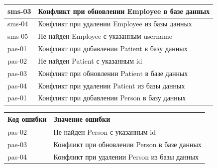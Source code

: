 \documentclass[a4paper,article]{article}
\begin{document}
\begin{sloppypar}
\begin{appendices}
\begin{xltabular}{\textwidth} { |
                >{\hsize} X |
                >{\hsize} X | }
            \hline
            sms-03
            & Конфликт при обновлении Employee в базе данных \\
            
            \hline
            sms-04
            & Конфликт при удалении Employee из базы данных \\
            
            \hline
            sms-05
            & Не найден Employee с указанным username \\
            
            \hline
            pas-01
            & Конфликт при добавлении Patient в базу данных \\
            
            \hline
            pas-02
            & Не найден Patient с указанным id \\
            
            \hline
            pas-03
            & Конфликт при обновлении Patient в базе данных \\
            
            \hline
            pas-04
            & Конфликт при удалении Patient из базы данных \\
            
            \hline
            pas-01
            & Конфликт при добавлении Person в базу данных \\
            
            \hline
        \end{xltabular}
            
        \begin{xltabular}{\textwidth} { |
                >{\hsize} X |
                >{\hsize} X | }
                
            \hline
            Код ошибки
            & Значение ошибки \\
                
            \hline
            pas-02
            & Не найден Person с указанным id \\
            
            \hline
            pas-03
            & Конфликт при обновлении Person в базе данных \\
            
            \hline
            pas-04
            & Конфликт при удалении Person из базы данных \\
            

\end{xltabular}
\end{appendices}
\end{sloppypar}
\end{document}
